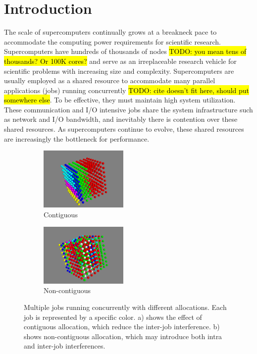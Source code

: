 \documentclass[conference]{IEEEtran}
\newcommand{\TODO}[1]{\hl{TODO: #1}}
\begin{document}
\IEEEpeerreviewmaketitle


\section{Introduction} 
\label{sec: intro}

The scale of supercomputers continually grows at a breakneck pace to accommodate the computing power requirements for scientific research. Supercomputers have hundreds of thousands of nodes \TODO{you mean tens of thousands? Or 100K cores?} and serve as an irreplaceable research vehicle for scientific problems with increasing size and complexity. Supercomputers are usually employed as a shared resource to accommodate many parallel applications (jobs) running concurrently \cite{zhou-ipdps} \TODO{cite doesn't fit here, should put somewhere else}. To be effective, they must maintain high system utilization. These communication and I/O intensive jobs share the system infrastructure such as network and I/O bandwidth, and inevitably there is contention over these shared resources. As supercomputers continue to evolve, these shared resources are increasingly the bottleneck for performance.


\begin{figure}[h!]
    \centering
    \begin{subfigure}[t]{0.2\textwidth}
        \centering
        \includegraphics[height=1.2in]{figs/goodallocation}
        \caption{Contiguous}
        \label{fig:overview_sub1}
    \end{subfigure}%
    \hspace{1em}%
    \begin{subfigure}[t]{0.2\textwidth}
        \centering
        \includegraphics[height=1.2in]{figs/badallocation}
        \caption{Non-contiguous}
        \label{fig:overview_sub2}
    \end{subfigure}%
   \caption{Multiple jobs running concurrently with different allocations. Each job is represented by a specific color. a) shows the effect of contiguous allocation, which reduce the inter-job interference. b) shows non-contiguous allocation, which may introduce both intra and inter-job interferences. }
   \label{fig:overview}
\end{figure}
\end{document}
